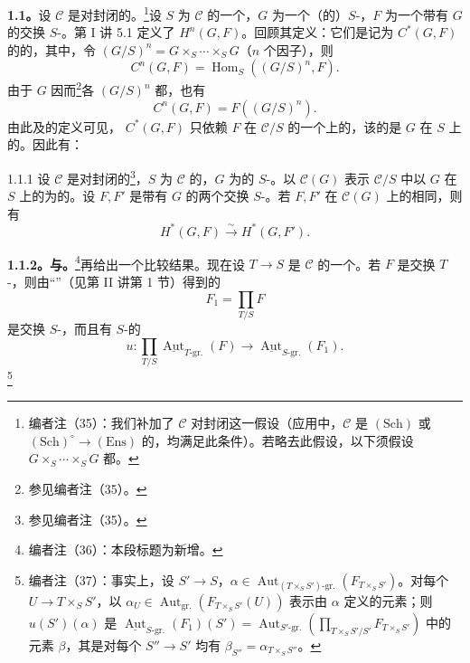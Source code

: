 \textbf{1.1。}设 $\mathcal C$ 是对封闭的。\footnote{编者注（35）：我们补加了 $\mathcal C$ 对封闭这一假设（应用中，$\mathcal C$ 是 $(\mathrm{Sch})$ 或 $(\mathrm{Sch})^\circ\to(\mathrm{Ens})$ 的，均满足此条件）。若略去此假设，以下须假设 $G\times_S\cdots\times_S G$ 都。}设 $S$ 为 $\mathcal C$ 的一个，$G$ 为一个（的）$S$-，$F$ 为一个带有 $G$ 的交换 $S$-。第 I 讲 5.1 定义了 $H^n(G,F)$。回顾其定义：它们是记为 $C^*(G,F)$ 的的，其中，令 $(G/S)^n=G\times_S\cdots\times_S G$（$n$ 个因子），则
\[
 C^n(G,F)=\operatorname{Hom}_S((G/S)^n,F).
\]
由于 $G$ 因而\footnote{参见编者注（35）。}各 $(G/S)^n$ 都，也有
\[
 C^n(G,F)=F((G/S)^n).
\]
由此及的定义可见， $C^*(G,F)$ 只依赖 $F$ 在 $\mathcal C/S$ 的一个上的，该的是 $G$ 在 $S$ 上的。因此有：
\begin{SGAresult}{}{1.1.1}
设 $\mathcal C$ 是对封闭的\footnote{参见编者注（35）。}，$S$ 为 $\mathcal C$ 的，$G$ 为的 $S$-。以 $\mathcal C(G)$ 表示 $\mathcal C/S$ 中以 $G$ 在 $S$ 上的为的。设 $F,F'$ 是带有 $G$ 的两个交换 $S$-。若 $F,F'$ 在 $\mathcal C(G)$ 上的相同，则有
\[
 H^*(G,F)\xrightarrow{\sim}H^*(G,F').
\]
\end{SGAresult}
\textbf{1.1.2。与。}\footnote{编者注（36）：本段标题为新增。}再给出一个比较结果。现在设 $T\to S$ 是 $\mathcal C$ 的一个。若 $F$ 是交换 $T$-，则由“”（见第 II 讲第 1 节）得到的
\[
 F_1=\prod_{T/S}F
\]
是交换 $S$-，而且有 $S$-的
\[
 u:\prod_{T/S}\underline{\operatorname{Aut}}_{T\text{-gr.}}(F)
 \longrightarrow\underline{\operatorname{Aut}}_{S\text{-gr.}}(F_1).
\]\footnote{编者注（37）：事实上，设 $S'\to S$，$\alpha\in\operatorname{Aut}_{(T\times_S S')\text{-gr.}}(F_{T\times_S S'})$。对每个 $U\to T\times_S S'$，以 $\alpha_U\in\operatorname{Aut}_{\mathrm{gr.}}(F_{T\times_S S'}(U))$ 表示由 $\alpha$ 定义的元素；则 $u(S')(\alpha)$ 是 $\underline{\operatorname{Aut}}_{S\text{-gr.}}(F_1)(S')=\operatorname{Aut}_{S'\text{-gr.}}(\prod_{T\times_S S'/S'}F_{T\times_S S'})$ 中的元素 $\beta$，其是对每个 $S''\to S'$ 均有 $\beta_{S''}=\alpha_{T\times_S S''}$。}
